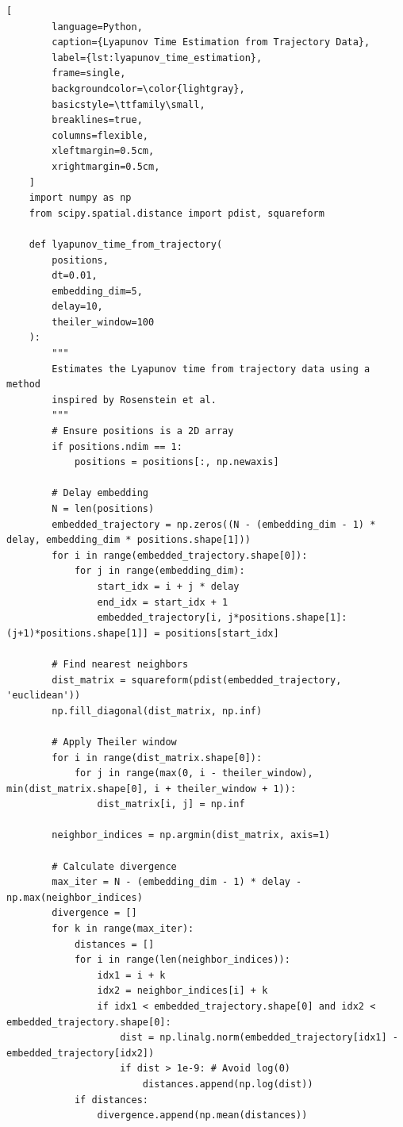 \begin{enumerate}
    \begin{lstlisting}[
        language=Python,
        caption={Lyapunov Time Estimation from Trajectory Data},
        label={lst:lyapunov_time_estimation},
        frame=single,
        backgroundcolor=\color{lightgray},
        basicstyle=\ttfamily\small,
        breaklines=true,
        columns=flexible,
        xleftmargin=0.5cm,
        xrightmargin=0.5cm,
    ]
    import numpy as np
    from scipy.spatial.distance import pdist, squareform

    def lyapunov_time_from_trajectory(
        positions,
        dt=0.01,
        embedding_dim=5,
        delay=10,
        theiler_window=100
    ):
        """
        Estimates the Lyapunov time from trajectory data using a method
        inspired by Rosenstein et al.
        """
        # Ensure positions is a 2D array
        if positions.ndim == 1:
            positions = positions[:, np.newaxis]

        # Delay embedding
        N = len(positions)
        embedded_trajectory = np.zeros((N - (embedding_dim - 1) * delay, embedding_dim * positions.shape[1]))
        for i in range(embedded_trajectory.shape[0]):
            for j in range(embedding_dim):
                start_idx = i + j * delay
                end_idx = start_idx + 1
                embedded_trajectory[i, j*positions.shape[1]:(j+1)*positions.shape[1]] = positions[start_idx]

        # Find nearest neighbors
        dist_matrix = squareform(pdist(embedded_trajectory, 'euclidean'))
        np.fill_diagonal(dist_matrix, np.inf)

        # Apply Theiler window
        for i in range(dist_matrix.shape[0]):
            for j in range(max(0, i - theiler_window), min(dist_matrix.shape[0], i + theiler_window + 1)):
                dist_matrix[i, j] = np.inf

        neighbor_indices = np.argmin(dist_matrix, axis=1)

        # Calculate divergence
        max_iter = N - (embedding_dim - 1) * delay - np.max(neighbor_indices)
        divergence = []
        for k in range(max_iter):
            distances = []
            for i in range(len(neighbor_indices)):
                idx1 = i + k
                idx2 = neighbor_indices[i] + k
                if idx1 < embedded_trajectory.shape[0] and idx2 < embedded_trajectory.shape[0]:
                    dist = np.linalg.norm(embedded_trajectory[idx1] - embedded_trajectory[idx2])
                    if dist > 1e-9: # Avoid log(0)
                        distances.append(np.log(dist))
            if distances:
                divergence.append(np.mean(distances))


\end{lstlisting}
\end{enumerate}
